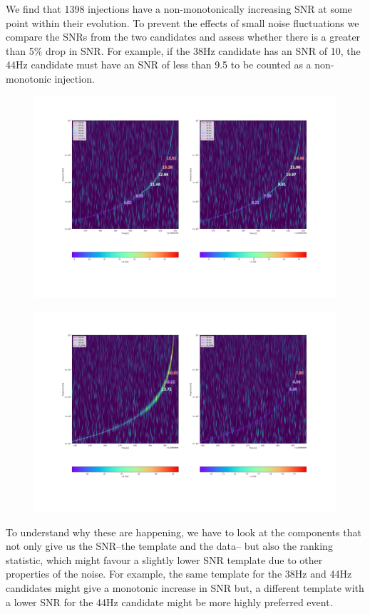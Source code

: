 We find that 1398 injections have a non-monotonically increasing SNR at some point within their evolution. To prevent the effects of small noise fluctuations we compare the SNRs from the two candidates and assess whether there is a greater than 5\% drop in SNR. For example, if the 38Hz candidate has an SNR of 10, the 44Hz candidate must have an SNR of less than 9.5 to be counted as a non-monotonic injection.
%
\begin{figure}
       \centering
    \includegraphics[width=\textwidth]{images/ew/small_non_monotonic.png}
    \caption{}
    \label{fig:ew_small_nonmono}
\end{figure}
%
\begin{figure}
       \centering
    \includegraphics[width=\textwidth]{images/ew/large_non_monotonic.png}
    \caption{}
    \label{fig:ew_large_nonmono}
\end{figure}
%
To understand why these are happening, we have to look at the components that not only give us the SNR--the template and the data-- but also the ranking statistic, which might favour a slightly lower SNR template due to other properties of the noise. For example, the same template for the 38Hz and 44Hz candidates might give a monotonic increase in SNR but, a different template with a lower SNR for the 44Hz candidate might be more highly preferred event.

